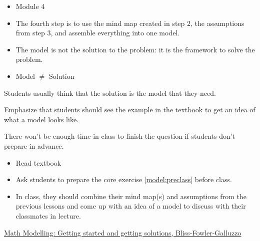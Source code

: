 \begin{lesson}

	\begin{itemize}
		\item Module 4
	\end{itemize}

	\begin{itemize}
		\item The fourth step is to use the mind map created in step 2, the assumptions from step 3, and assemble everything into one model.
		
		\item The model is not the solution to the problem: it is the framework to solve the problem. 
	\end{itemize}
	


\begin{annotation}
\begin{notes}
	\begin{itemize}
	\item Model $\neq$ Solution
	\end{itemize}
\end{notes}
\end{annotation}
Students usually think that the solution is the model that they need.

Emphasize that students should see the example in the textbook to get an idea of what a model looks like.

\begin{annotation}
\begin{notes}
	There won't be enough time in class to finish the question if students don't prepare in advance.
\end{notes}	
\end{annotation}

\begin{itemize}
	\item Read textbook
	\item Ask students to prepare the core exercise \ref{model:preclass} before class.

	\item In class, they should combine their mind map(s) and assumptions from the previous lessons and come up with an idea of a model to discuss with their classmates in lecture.

\end{itemize}

\begin{annotation}
	\begin{goals}
	\end{goals}
\end{annotation}
	 \href{https://m3challenge.siam.org/resources/modeling-handbook}{Math Modelling: Getting started and getting solutions, Bliss-Fowler-Galluzzo}

\end{lesson}





